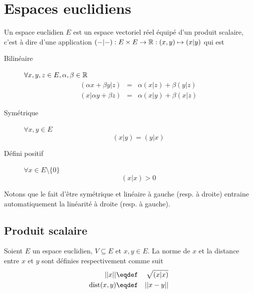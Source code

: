\section{Espaces euclidiens}
\begin{mydef}
	Un espace euclidien $E$ est un espace vectoriel réel équipé d'un produit scalaire, c'est à dire d'une application
	$(-|-) : E \times E \to \mathbb{R} : (x, y) \mapsto (x|y)$ qui est
	\begin{description}
			\item[Bilinéaire]
			$\forall x, y, z \in E, \alpha, \beta \in \mathbb{R}$
			\begin{eqnarray*}
				(\alpha x + \beta y | z) & = & \alpha (x | z) + \beta (y | z)\\
				(x | \alpha y + \beta z) & = & \alpha (x | y) + \beta (x | z)
			\end{eqnarray*}
			\item[Symétrique]
			$\forall x,y \in E$
			$$(x|y) = (y|x)$$
			\item[Défini positif]
			$\forall x \in E \setminus \{0\}$
			$$(x|x) > 0$$
	\end{description}
\end{mydef}

\begin{myrem}
	Notons que le fait d'être symétrique et linéaire à gauche (resp. à droite) entraine automatiquement la linéarité à droite (resp. à gauche).
\end{myrem}

\subsection{Produit scalaire}

\begin{mydef}
	Soient $E$ un espace euclidien, $V \subseteq E$ et $x,y \in E$.
	La norme de $x$ et la distance entre $x$ et $y$ sont définies respectivement comme suit
	\begin{eqnarray*}
		||x|| & \eqdef & \sqrt{(x|x)}\\
		\dist(x, y) & \eqdef & ||x - y||\\
	\end{eqnarray*}
\end{mydef}

